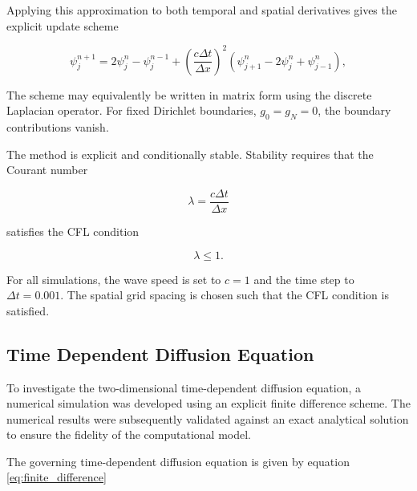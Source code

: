 \documentclass[10pt, journal]{IEEEtran}
\begin{document}
        Applying this approximation to both temporal and spatial derivatives gives the explicit update scheme
        
        \begin{equation}
        \psi_j^{n+1}
        =
        2\psi_j^n
        -
        \psi_j^{n-1}
        +
        \left(\frac{c\Delta t}{\Delta x}\right)^2
        \left(
        \psi_{j+1}^n
        -
        2\psi_j^n
        +
        \psi_{j-1}^n
        \right),
        \label{eq:wave_scheme}
        \end{equation}
        
        The scheme may equivalently be written in matrix form using the discrete Laplacian operator. For fixed Dirichlet boundaries, $g_0=g_N=0$, the boundary contributions vanish.
        
        The method is explicit and conditionally stable. Stability requires that the Courant number
        
        \begin{equation}
        \lambda
        =
        \frac{c\Delta t}{\Delta x}
        \end{equation}
        
        satisfies the CFL condition
        
        \begin{equation}
        \lambda \le 1.
        \label{eq:wave_stability}
        \end{equation}
        
        For all simulations, the wave speed is set to $c=1$ and the time step to $\Delta t = 0.001$. The spatial grid spacing is chosen such that the CFL condition is satisfied.



    



\subsection{Time Dependent Diffusion Equation}

To investigate the two-dimensional time-dependent diffusion equation, a numerical simulation was developed using an explicit finite difference scheme. The numerical results were subsequently validated against an exact analytical solution to ensure the fidelity of the computational model.


The governing time-dependent diffusion equation is given by equation \ref{eq:finite_difference}
\end{document}

